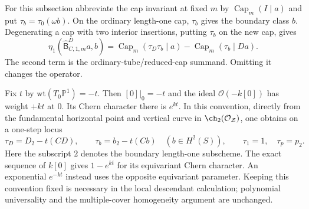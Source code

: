 For this subsection abbreviate the cap invariant at fixed $m$ by
$\operatorname{Cap}_m(I\mid a)$ and put
$\tau_b=\tau_0(\omega b)$. On the ordinary length-one cap,
$\tau_b$ gives the boundary class $b$. Degenerating a cap with two
interior insertions, putting $\tau_b$ on the new cap, gives
\begin{equation}\label{rdt:eq:capdifference}
 \eta_1(\widehat{\mathsf B}^D_{C,1,m}a,b)
 =\operatorname{Cap}_m(\tau_D\tau_b\mid a)
   -\operatorname{Cap}_m(\tau_b\mid Da).
\end{equation}
The second term is the ordinary-tube/reduced-cap summand. Omitting it
changes the operator.

Fix $t$ by $\mathrm{wt}(T_0\mathbb P^1)=-t$. Then
$[0]|_0=-t$ and the ideal $\mathcal O(-k[0])$ has weight $+kt$
at $0$. Its Chern character there is $e^{kt}$. In this convention,
directly from the fundamental horizontal point and vertical curve in
$\ch_2(\mathcal O_{\mathcal Z})$, one obtains on a one-step locus
\begin{equation}\label{rdt:eq:descweights}
 \tau_D=D_2-t(CD),\qquad
 \tau_b=b_2-t(Cb)\quad(b\in H^2(S)),\qquad
 \tau_1=1,\quad\tau_p=p_2.
\end{equation}
Here the subscript $2$ denotes the boundary length-one subscheme.
The exact sequence of $k[0]$ gives $1-e^{kt}$ for its equivariant
Chern character. An exponential $e^{-kt}$ instead uses the opposite
equivariant parameter. Keeping this convention fixed is necessary in
the local descendant calculation; polynomial universality and the
multiple-cover homogeneity argument are unchanged.

